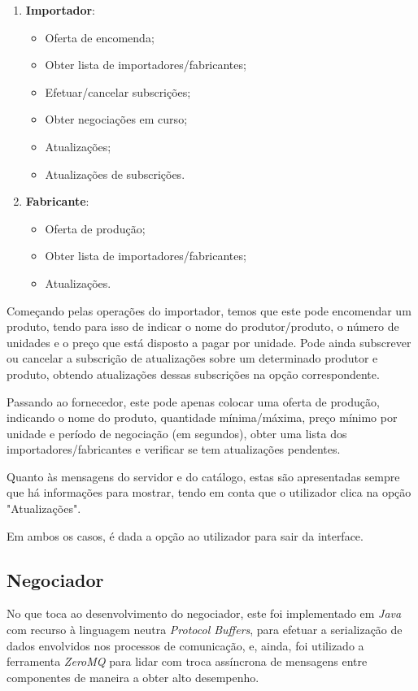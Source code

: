 \documentclass[a4paper]{report}
\begin{document}
	\begin{enumerate}
		\item \textbf{Importador}:
		\begin{itemize}
			\item Oferta de encomenda;
			\item Obter lista de importadores/fabricantes;
			\item Efetuar/cancelar subscrições;
			\item Obter negociações em curso;
			\item Atualizações;
			\item Atualizações de subscrições.
		\end{itemize}

		\item \textbf{Fabricante}:
		\begin{itemize}
			\item Oferta de produção;
			\item Obter lista de importadores/fabricantes;
			\item Atualizações.
		\end{itemize}
	\end{enumerate}

	Começando pelas operações do importador, temos que este pode encomendar um produto, tendo para isso de indicar o nome do produtor/produto, o número de unidades e o preço que está disposto a pagar por unidade. Pode ainda subscrever ou cancelar a subscrição de atualizações sobre um determinado produtor e produto, obtendo atualizações dessas subscrições na opção correspondente.
	
	Passando ao fornecedor, este pode apenas colocar uma oferta de produção, indicando o nome do produto, quantidade mínima/máxima, preço mínimo por unidade e período de negociação (em segundos), obter uma lista dos importadores/fabricantes e verificar se tem atualizações pendentes.
	
	Quanto às mensagens do servidor e do catálogo, estas são apresentadas sempre que há informações para mostrar, tendo em conta que o utilizador clica na opção "Atualizações".
	
	Em ambos os casos, é dada a opção ao utilizador para sair da interface.

	\subsection{Negociador}
	No que toca ao desenvolvimento do negociador, este foi implementado em \textit{Java} com recurso à linguagem neutra \textit{Protocol Buffers}, para efetuar a serialização de dados envolvidos nos processos de comunicação, e, ainda, foi utilizado a ferramenta \textit{ZeroMQ} para lidar com troca assíncrona de mensagens entre componentes de maneira a obter alto desempenho. 
	
\end{document}
